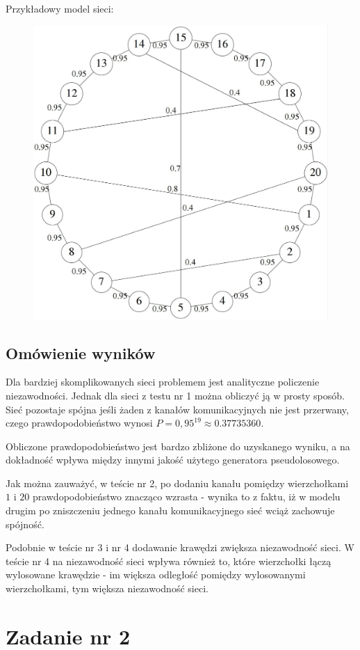 \documentclass[titlepage]{article}
\begin{document}
\noindent Przykładowy model sieci:
\begin{figure}[h!]
	\centering
	\includegraphics[width=0.8\linewidth]{graph4.jpg}
\end{figure}

\newpage
\subsection{Omówienie wyników}
Dla bardziej skomplikowanych sieci problemem jest analityczne policzenie niezawodności. Jednak dla sieci z testu nr 1 można obliczyć ją w prosty sposób. Sieć pozostaje spójna jeśli żaden z kanałów komunikacyjnych nie jest przerwany, czego prawdopodobieństwo wynosi $P = 0,95^{19} \approx 0.37735360$.

Obliczone prawdopodobieństwo jest bardzo zbliżone do uzyskanego wyniku, a na dokładność wpływa między innymi jakość użytego generatora pseudolosowego.

Jak można zauważyć, w teście nr 2, po dodaniu kanału pomiędzy wierzchołkami $1$ i $20$ prawdopodobieństwo znacząco wzrasta - wynika to z faktu, iż w modelu drugim po zniszczeniu jednego kanału komunikacyjnego sieć wciąż zachowuje spójność.

Podobnie w teście nr 3 i nr 4 dodawanie krawędzi zwiększa niezawodność sieci. W teście nr 4 na niezawodność sieci wpływa również to, które wierzchołki łączą wylosowane krawędzie - im większa odległość pomiędzy wylosowanymi wierzchołkami, tym większa niezawodność sieci.

\newpage
\section{Zadanie nr 2}
\end{document}
